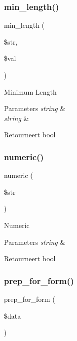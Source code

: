 \subsubsection{\texorpdfstring{min\_length()}{min\_length()}}
{\footnotesize\ttfamily min\+\_\+length (\begin{DoxyParamCaption}\item[{}]{\$str,  }\item[{}]{\$val }\end{DoxyParamCaption})}

Minimum Length


\begin{DoxyParams}{Parameters}
{\em string} & \\
\hline
{\em string} & \\
\hline
\end{DoxyParams}
\begin{DoxyReturn}{Retourneert}
bool 
\end{DoxyReturn}
\mbox{\label{class_c_i___form__validation_a058a2b065a28a929956630238d5bf5bb}} 
\subsubsection{\texorpdfstring{numeric()}{numeric()}}
{\footnotesize\ttfamily numeric (\begin{DoxyParamCaption}\item[{}]{\$str }\end{DoxyParamCaption})}

Numeric


\begin{DoxyParams}{Parameters}
{\em string} & \\
\hline
\end{DoxyParams}
\begin{DoxyReturn}{Retourneert}
bool 
\end{DoxyReturn}
\mbox{\label{class_c_i___form__validation_a53938e0a994c9995de5c979ecb27bf1d}} 
\subsubsection{\texorpdfstring{prep\_for\_form()}{prep\_for\_form()}}
{\footnotesize\ttfamily prep\+\_\+for\+\_\+form (\begin{DoxyParamCaption}\item[{}]{\$data }\end{DoxyParamCaption})}

